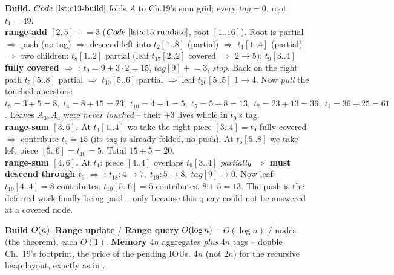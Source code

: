 \begin{tracebox}
\textbf{Build.} \(\coderef{c13-build}\) folds \(A\) to Ch.19's sum grid; every \(\mathit{tag}=0\), root \(t_1=49\).\\
\textbf{range-add \([2,5]\mathrel{+}=3\)} (\(\coderef{c15-rupdate}\), root \([1..16]\)). Root is partial \(\Rightarrow\) push (no tag) \(\Rightarrow\) descend left into \(t_2[1..8]\) (partial) \(\Rightarrow\) \(t_4[1..4]\) (partial) \(\Rightarrow\) two children: \(t_8[1..2]\) partial (leaf \(t_{17}[2..2]\) covered \(\Rightarrow\)  \(2{\to}5\)); \(t_9[3..4]\) \textbf{fully covered} \(\Rightarrow\) : \(t_9=9+3{\cdot}2=15\), \(\mathit{tag}[9]\mathrel{+}=3\), \emph{stop}.  Back on the right path \(t_5[5..8]\) partial \(\Rightarrow\) \(t_{10}[5..6]\) partial \(\Rightarrow\) leaf \(t_{20}[5..5]\)  \(1{\to}4\).  Now \emph{pull} the touched ancestors: \(t_8{=}3{+}5{=}8,\;t_4{=}8{+}15{=}23,\;t_{10}{=}4{+}1{=}5,\;t_5{=}5{+}8{=}13,\;t_2{=}23{+}13{=}36,\;t_1{=}36{+}25{=}61\).  Leaves \(A_3,A_4\) were \emph{never touched} -- their \(+3\) lives whole in \(t_9\)'s tag.\\
\textbf{range-sum \([3,6]\).} At \(t_4[1..4]\) we take the right piece \([3..4]=t_9\) fully covered \(\Rightarrow\) contribute \(t_9=15\) (its tag is already folded, no push).  At \(t_5[5..8]\) we take left piece \([5..6]=t_{10}=5\).  Total \(15+5=\boxed{20}\).\\
\textbf{range-sum \([4,6]\).} At \(t_4\): piece \([4..4]\) overlaps \(t_9[3..4]\) \emph{partially} \(\Rightarrow\) \textbf{must descend through \(t_9\)} \(\Rightarrow\) : \(t_{18}:4{\to}7,\;t_{19}:5{\to}8,\;\mathit{tag}[9]\to0\).  Now leaf \(t_{19}[4..4]=8\) contributes.  \(t_{10}[5..6]=5\) contributes.  \(8+5=\boxed{13}\).  The push is the deferred work finally being paid -- only because this query could not be answered at a covered node.
\end{tracebox}

\begin{complexitybox}
\textbf{Build} \(O(n)\).  \textbf{Range update} / \textbf{Range query} \(O(\log n)\) -- \(O(\log n)\) / nodes (the theorem), each \(O(1)\).  \textbf{Memory} \(4n\) aggregates \emph{plus} \(4n\) tags -- double Ch.~19's footprint, the price of the pending IOUs.  \(4n\) (not \(2n\)) for the recursive heap layout, exactly as in .
\end{complexitybox}

